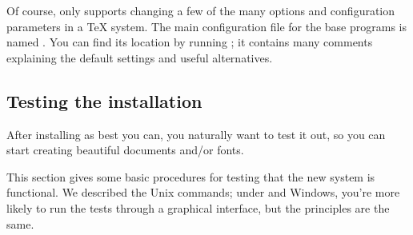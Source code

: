 \documentclass{article}
\begin{document}
Of course,  only supports changing a few of the many
options and configuration parameters in a \TeX{} system.  The main
configuration file for the base \Webc{} programs is named
.  You can find its location by running
; it contains many comments explaining the
default settings and useful alternatives.


\subsection{Testing the installation}
\label{sec:test-install}

After installing \TeXLive{} as best you can, you naturally want to test
it out, so you can start creating beautiful documents and/or fonts.

This section gives some basic procedures for testing that the new system
is functional.  We described the Unix commands; under \MacOSX{} and
Windows, you're more likely to run the tests through a graphical
interface, but the principles are the same.
\end{document}
